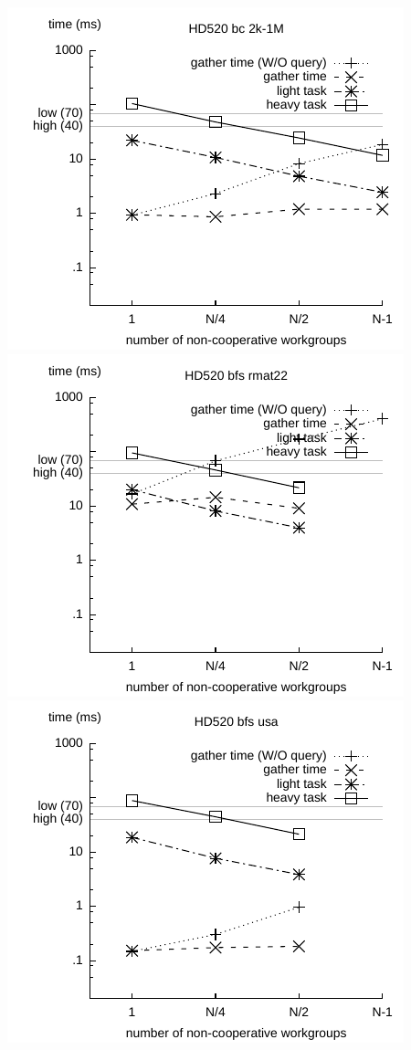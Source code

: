 \documentclass[parskip=half,sigconf,review, anonymous=true, acmcopyrightmode=none]{acmart}
\begin{document}
\includegraphics[width=.7\columnwidth]{images/barrier/hd520_bc_2k_1M.pdf} \\
\includegraphics[width=.7\columnwidth]{images/barrier/hd520_bfs_rmat22.pdf} \\
\includegraphics[width=.7\columnwidth]{images/barrier/hd520_bfs_usa.pdf} \\
\end{document}
